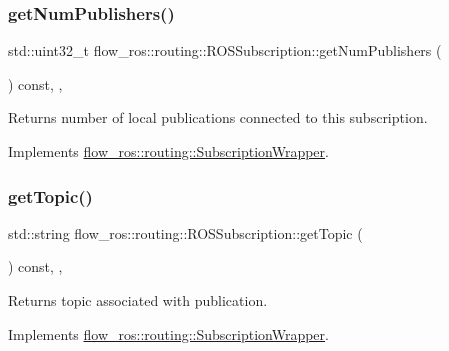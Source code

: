 \subsubsection{\texorpdfstring{get\+Num\+Publishers()}{getNumPublishers()}}
{\footnotesize\ttfamily std\+::uint32\+\_\+t flow\+\_\+ros\+::routing\+::\+R\+O\+S\+Subscription\+::get\+Num\+Publishers (\begin{DoxyParamCaption}{ }\end{DoxyParamCaption}) const\hspace{0.3cm}{\ttfamily [inline]}, {\ttfamily [override]}, {\ttfamily [virtual]}}



Returns number of local publications connected to this subscription. 



Implements \hyperlink{classflow__ros_1_1routing_1_1_subscription_wrapper_a8ae55d34a07c505dc2b4bcb2440b2d32}{flow\+\_\+ros\+::routing\+::\+Subscription\+Wrapper}.

\mbox{\label{classflow__ros_1_1routing_1_1_r_o_s_subscription_a3bdbb4897a1a8bdb67af2f72fb7645a7}} 
\subsubsection{\texorpdfstring{get\+Topic()}{getTopic()}}
{\footnotesize\ttfamily std\+::string flow\+\_\+ros\+::routing\+::\+R\+O\+S\+Subscription\+::get\+Topic (\begin{DoxyParamCaption}{ }\end{DoxyParamCaption}) const\hspace{0.3cm}{\ttfamily [inline]}, {\ttfamily [override]}, {\ttfamily [virtual]}}



Returns topic associated with publication. 



Implements \hyperlink{classflow__ros_1_1routing_1_1_subscription_wrapper_a2ef27475e7b7d7555e90d02cdc220b88}{flow\+\_\+ros\+::routing\+::\+Subscription\+Wrapper}.

\mbox{\label{classflow__ros_1_1routing_1_1_r_o_s_subscription_a3dc2cff4348f072352a307c6902d1a18}} 

